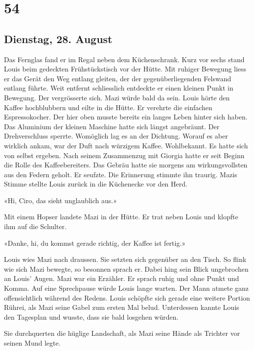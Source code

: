 \chapter{54}
  
\section{Dienstag, 28. August} 

Das Fernglas fand er im Regal neben dem Küchenschrank. Kurz vor sechs
stand Louis beim gedeckten Frühstückstisch vor der Hütte. Mit
ruhiger Bewegung liess er das Gerät den Weg entlang gleiten, der der
gegenüberliegenden Felswand entlang führte. Weit entfernt schliesslich entdeckte er einen
kleinen Punkt in Bewegung. Der vergrösserte sich. Mazi würde bald da
sein.
Louis hörte den Kaffee hochblubbern und eilte in die Hütte. Er verehrte
die einfachen Espressokocher. Der hier oben musste bereits ein langes
Leben hinter sich haben. Das Aluminium der kleinen Maschine hatte sich längst
angebräunt. Der Drehverschluss sperrte. Womöglich lag es an der
Dichtung. Worauf es aber wirklich ankam, war der Duft nach würzigem
Kaffee. Wohlbekannt. Es hatte sich von selbst
ergeben. Nach seinem Zusammenzug mit Giorgia hatte er seit Beginn die
Rolle des Kaffeebereiters. Das Gebräu hatte sie morgens am
wirkungsvollsten aus den Federn geholt. Er seufzte. Die Erinnerung
stimmte ihn traurig.
Mazis Stimme stellte Louis zurück in die Küchenecke vor den Herd.

«Hi, Ciro, das sieht unglaublich aus.»

Mit einem Hopser landete Mazi in der Hütte. Er trat neben Louis und klopfte
ihm auf die Schulter.

«Danke, hi, du kommst gerade richtig, der Kaffee ist fertig.»

Louis wies Mazi nach draussen. Sie setzten sich gegenüber an den Tisch.
So flink wie sich Mazi bewegte, so besonnen sprach er. Dabei hing sein
Blick ungebrochen an Louis’ Augen.
Mazi war ein Erzähler. Er sprach ruhig und ohne Punkt und Komma. Auf
eine Sprechpause würde Louis lange warten. Der Mann atmete ganz
offensichtlich während des Redens. Louis schöpfte sich gerade eine
weitere Portion Rührei, als Mazi seine Gabel zum ersten Mal belud.
Unterdessen kannte Louis den Tagesplan und wusste, dass sie bald
losgehen würden.

\sectionbreak

Sie durchquerten die hüglige Landschaft, als Mazi seine Hände als
Trichter vor seinen Mund legte.

